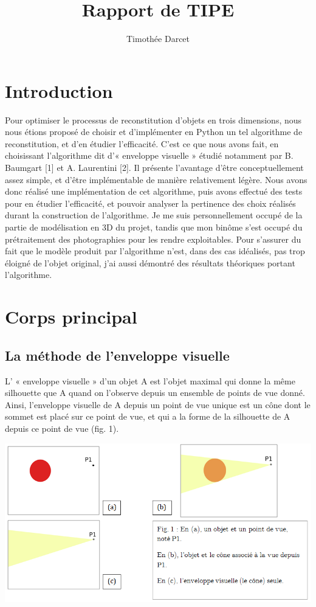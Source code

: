 \documentclass[a4paper]{article}
\title{Rapport de TIPE}
\author{Timothée Darcet}
\begin{document}
  \maketitle

  \pagebreak

  \tableofcontents

  \pagebreak

  \section{Introduction}
    Pour optimiser le processus de reconstitution d’objets en trois dimensions, nous nous étions proposé de choisir et d’implémenter en Python un tel algorithme de reconstitution, et d’en étudier l’efficacité. C’est ce que nous avons fait, en choisissant l’algorithme dit d’« enveloppe visuelle » étudié notamment par B. Baumgart [1] et A. Laurentini [2]. Il présente l’avantage d’être conceptuellement assez simple, et d’être implémentable de manière relativement légère.
    Nous avons donc réalisé une implémentation de cet algorithme, puis avons effectué des tests pour en étudier l’efficacité, et pouvoir analyser la pertinence des choix réalisés durant la construction de l’algorithme. Je me suis personnellement occupé de la partie de modélisation en 3D du projet, tandis que mon binôme s’est occupé du prétraitement des photographies pour les rendre exploitables. Pour s’assurer du fait que le modèle produit par l’algorithme n’est, dans des cas idéalisés, pas trop éloigné de l’objet original, j’ai aussi démontré des résultats théoriques portant l’algorithme. 

  \section{Corps principal}
    \subsection{La méthode de l'enveloppe visuelle}
      L’ « enveloppe visuelle » d’un objet A est l’objet maximal qui donne la même silhouette que A quand on l’observe depuis un ensemble de points de vue donné. Ainsi, l’enveloppe visuelle de A depuis un point de vue unique est un cône dont le sommet est placé sur ce point de vue, et qui a la forme de la silhouette de A depuis ce point de vue (fig. 1).

      \includegraphics[width=\textwidth]{ScreenSchema1}      
\end{document}
